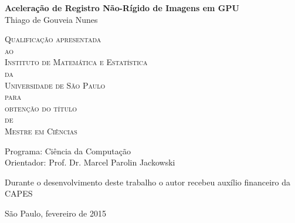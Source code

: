 \documentclass[11pt,twoside,a4paper]{book}
\begin{document}
\frontmatter 
\fancyhead[RO]{{\footnotesize\rightmark}\hspace{2em}\thepage}
\setcounter{tocdepth}{2}
\fancyhead[LE]{\thepage\hspace{2em}\footnotesize{\leftmark}}
\fancyhead[RE,LO]{}
\fancyhead[RO]{{\footnotesize\rightmark}\hspace{2em}\thepage}

\onehalfspacing  %

\thispagestyle{empty}
\begin{center}
    \vspace*{2.3cm}
    \textbf{\Large{Aceleração de Registro Não-Rígido de Imagens em GPU}}\\
    
    \vspace*{1.2cm}
    \Large{Thiago de Gouveia Nunes}
    
    \vskip 2cm
    \textsc{
    Qualificação apresentada\\[-0.25cm] 
    ao\\[-0.25cm]
    Instituto de Matemática e Estatística\\[-0.25cm]
    da\\[-0.25cm]
    Universidade de São Paulo\\[-0.25cm]
    para\\[-0.25cm]
    obtenção do título\\[-0.25cm]
    de\\[-0.25cm]
    Mestre em Ciências}
    
    \vskip 1.5cm
    Programa: Ciência da Computação\\
    Orientador: Prof. Dr. Marcel Parolin Jackowski

    \vskip 1cm
    \normalsize{Durante o desenvolvimento deste trabalho o autor recebeu auxílio
    financeiro da CAPES}
    
    \vskip 0.5cm
    \normalsize{São Paulo, fevereiro de 2015}
\end{center}

%
%
%
\end{document}
